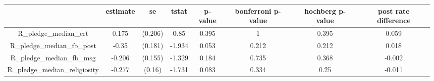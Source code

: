 \begin{tabular}{cccccccc}
  \hline
 & estimate & se & tstat & p-value & bonferroni p-value & hochberg p-value & post rate difference \\ 
  \hline
R\_pledge\_median\_crt & 0.175 & (0.206) & 0.85 & 0.395 & 1 & 0.395 & 0.059 \\ 
  R\_pledge\_median\_fb\_post & -0.35 & (0.181) & -1.934 & 0.053 & 0.212 & 0.212 & 0.018 \\ 
  R\_pledge\_median\_fb\_msg & -0.206 & (0.155) & -1.329 & 0.184 & 0.735 & 0.368 & -0.002 \\ 
  R\_pledge\_median\_religiosity & -0.277 & (0.16) & -1.731 & 0.083 & 0.334 & 0.25 & -0.011 \\ 
   \hline
\end{tabular}
